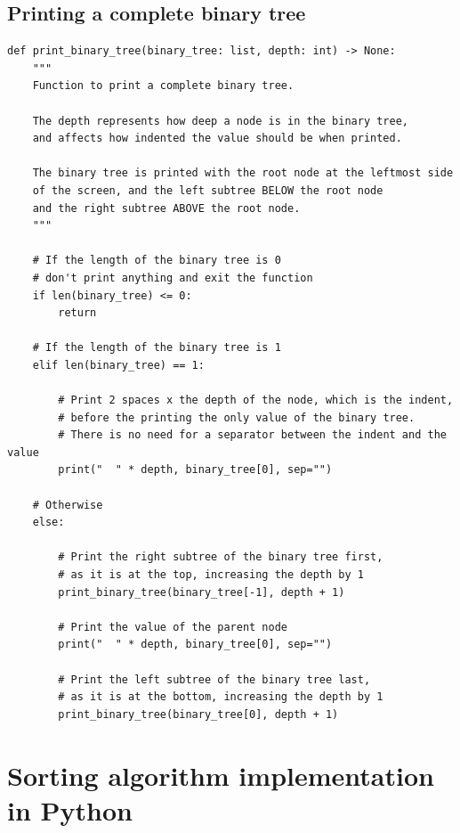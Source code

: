 \documentclass[11pt]{article}
\begin{document}
 \newpage

\subsection{Printing a complete binary tree}
\label{sec:orgb4c2192}
\begin{verbatim}
def print_binary_tree(binary_tree: list, depth: int) -> None:
    """
    Function to print a complete binary tree.

    The depth represents how deep a node is in the binary tree,
    and affects how indented the value should be when printed.

    The binary tree is printed with the root node at the leftmost side
    of the screen, and the left subtree BELOW the root node
    and the right subtree ABOVE the root node.
    """

    # If the length of the binary tree is 0
    # don't print anything and exit the function
    if len(binary_tree) <= 0:
        return

    # If the length of the binary tree is 1
    elif len(binary_tree) == 1:

        # Print 2 spaces x the depth of the node, which is the indent,
        # before the printing the only value of the binary tree.
        # There is no need for a separator between the indent and the value
        print("  " * depth, binary_tree[0], sep="")

    # Otherwise
    else:

        # Print the right subtree of the binary tree first,
        # as it is at the top, increasing the depth by 1
        print_binary_tree(binary_tree[-1], depth + 1)

        # Print the value of the parent node
        print("  " * depth, binary_tree[0], sep="")

        # Print the left subtree of the binary tree last,
        # as it is at the bottom, increasing the depth by 1
        print_binary_tree(binary_tree[0], depth + 1)
\end{verbatim}

 \newpage

\section{Sorting algorithm implementation in Python}
\label{sec:org0b20c6d}
\end{document}
